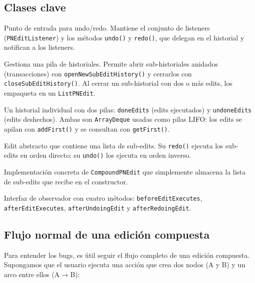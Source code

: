 \documentclass[12pt,a4paper]{article}
\newcommand{\code}[1]{\texttt{#1}}
\newcommand{\clase}[1]{\texttt{#1}}
\newcommand{\metodo}[1]{\texttt{#1}}
\begin{document}
\subsection{Clases clave}

\begin{description}[style=nextline, leftmargin=2em]
\raggedright

\item[\clase{PNESupport}]
  Punto de entrada para undo/redo. Mantiene el conjunto de listeners
  (\clase{PNEditListener}) y los métodos \metodo{undo()} y \metodo{redo()},
  que delegan en el historial y notifican a los listeners.

\item[\clase{EditsHistoryStacker}]
  Gestiona una pila de historiales. Permite abrir sub-historiales anidados
  (transacciones) con \metodo{openNewSubEditHistory()} y cerrarlos con
  \metodo{closeSubEditHistory()}. Al cerrar un sub-historial con dos o más
  edits, los empaqueta en un \clase{ListPNEdit}.

\item[\clase{EditsHistory}]
  Un historial individual con dos pilas: \code{doneEdits} (edits ejecutados)
  y \code{undoneEdits} (edits deshechos). Ambas son \clase{ArrayDeque} usadas
  como pilas LIFO: los edits se apilan con \metodo{addFirst()} y se
  consultan con \metodo{getFirst()}.

\item[\clase{CompoundPNEdit}]
  Edit abstracto que contiene una lista de sub-edits. Su \metodo{redo()}
  ejecuta los sub-edits en orden directo; su \metodo{undo()} los ejecuta
  en orden inverso.

\item[\clase{ListPNEdit}]
  Implementación concreta de \clase{CompoundPNEdit} que simplemente almacena
  la lista de sub-edits que recibe en el constructor.

\item[\clase{PNEditListener}]
  Interfaz de observador con cuatro métodos: \metodo{beforeEditExecutes},
  \metodo{afterEditExecutes}, \metodo{afterUndoingEdit} y
  \metodo{afterRedoingEdit}.

\end{description}


\subsection{Flujo normal de una edición compuesta}

Para entender los bugs, es útil seguir el flujo completo de una edición
compuesta. Supongamos que el usuario ejecuta una acción que crea dos nodos
(A y B) y un arco entre ellos (A$\to$B):
\end{document}
